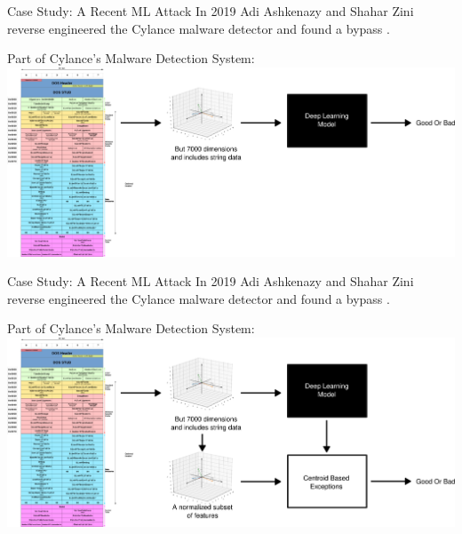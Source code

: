 \documentclass{beamer}
\begin{document}
\begin{frame}{Case Study: A Recent ML Attack}
    In 2019 Adi Ashkenazy and Shahar Zini reverse engineered the Cylance malware detector and found a bypass \cite{cylance_i_kill_you}.
    \vspace{10pt}
    \begin{center}
        Part of Cylance's Malware Detection System:
        \includegraphics[scale=0.15]{cylance_diagram1.png}
    \end{center}
\end{frame}

\begin{frame}{Case Study: A Recent ML Attack}
    In 2019 Adi Ashkenazy and Shahar Zini reverse engineered the Cylance malware detector and found a bypass \cite{cylance_i_kill_you}.
    \vspace{10pt}
    \begin{center}
        Part of Cylance's Malware Detection System:
        \includegraphics[scale=0.15]{cylance_diagram2.png}
    \end{center}
\end{frame}
\end{document}
